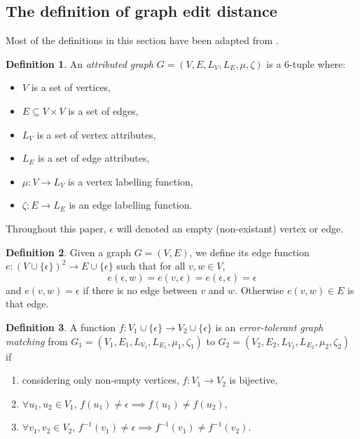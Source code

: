 \documentclass{article}
\theoremstyle{definition}
\newtheorem{definition}{Definition}
\begin{document}
\subsection{The definition of graph edit distance}
\label{sec:ged}
Most of the definitions in this section have been adapted from \cite{abu-aisheh_2016}.
\begin{definition}
  An \emph{attributed graph} $G = (V, E, L_V, L_E, \mu, \zeta)$ is a 6-tuple where:
  \begin{itemize}
  \item $V$ is a set of vertices,
  \item $E \subseteq V \times V$ is a set of edges,
  \item $L_V$ is a set of vertex attributes,
  \item $L_E$ is a set of edge attributes,
  \item $\mu : V \to L_V$ is a vertex labelling function,
  \item $\zeta : E \to L_E$ is an edge labelling function.
  \end{itemize}
  Throughout this paper, $\epsilon$ will denoted an empty (non-existant) vertex or edge.
\end{definition}
\begin{definition}
  Given a graph $G = (V, E)$, we define its edge function $e: (V \cup \{ \epsilon \})^2 \to E \cup \{ \epsilon \}$ such that for all $v, w \in V$,
  \[ e(\epsilon, w) = e(v, \epsilon) = e(\epsilon, \epsilon) = \epsilon \]
  and $e(v, w) = \epsilon$ if there is no edge between $v$ and $w$. Otherwise $e(v, w) \in E$ is that edge.
\end{definition}
\begin{definition}
  A function $f: V_1 \cup \{ \epsilon \} \to V_2 \cup \{ \epsilon \}$ is an \emph{error-tolerant graph matching} from $G_1 = (V_1, E_1, L_{V_1}, L_{E_1}, \mu_1, \zeta_1)$ to $G_2 = (V_2, E_2, L_{V_2}, L_{E_2}, \mu_2, \zeta_2)$ if
  \begin{enumerate}
  \item considering only non-empty vertices, $f: V_1 \to V_2$ is bijective,
  \item $\forall u_1, u_2 \in V_1$, $f(u_1) \ne \epsilon \implies f(u_1) \ne f(u_2)$,
  \item $\forall v_1, v_2 \in V_2$, $f^{-1}(v_1) \ne \epsilon \implies f^{-1}(v_1) \ne f^{-1}(v_2)$.
  \end{enumerate}
\end{definition}
\end{document}
